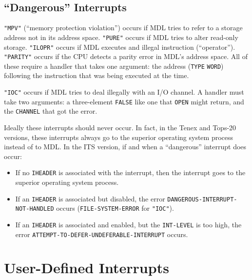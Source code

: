 \documentclass[a4paper]{scrbook}
\providecommand{\tightlist}{%
  \setlength{\itemsep}{0pt}\setlength{\parskip}{0pt}}
\begin{document}
\subsection{\texorpdfstring{``Dangerous''
Interrupts}{21.8.15. Dangerous Interrupts}}\label{dangerous-interrupts}

\texttt{"MPV"}  (``memory protection violation'') occurs if MDL tries to refer to a storage
address not in its address space. \texttt{"PURE"}  occurs if MDL tries to alter read-only
storage. \texttt{"ILOPR"}  occurs if MDL executes and illegal instruction (``operator'').
\texttt{"PARITY"}  occurs if the CPU detects a parity error in MDL's address space. All
of these require a handler that takes one argument: the address (\texttt{TYPE} \texttt{WORD}) following the instruction
that was being executed at the time.

\texttt{"IOC"}  occurs if MDL tries to deal illegally with an I/O channel. A handler must
take two arguments: a three-element \texttt{FALSE} like one that \texttt{OPEN} might return, and the \texttt{CHANNEL} that
got the error.

Ideally these interrupts should never occur. In fact, in the Tenex and
Tops-20 versions, these interrupts always go to the superior operating system process instead of to
MDL. In the ITS version, if and when a ``dangerous'' interrupt does occur:

\begin{itemize}
\tightlist
\item
  If no \texttt{IHEADER} is associated with the interrupt, then the interrupt goes to the superior operating system
  process.
\item
  If an \texttt{IHEADER} is associated but disabled, the error \texttt{DANGEROUS-INTERRUPT-NOT-HANDLED} occurs
  (\texttt{FILE-SYSTEM-ERROR} for \texttt{"IOC"}).
\item
  If an \texttt{IHEADER} is associated and enabled, but the \texttt{INT-LEVEL} is too high, the error
  \texttt{ATTEMPT-TO-DEFER-UNDEFERABLE-INTERRUPT} occurs.
\end{itemize}

\section{User-Defined Interrupts}\label{user-defined-interrupts}
\end{document}
